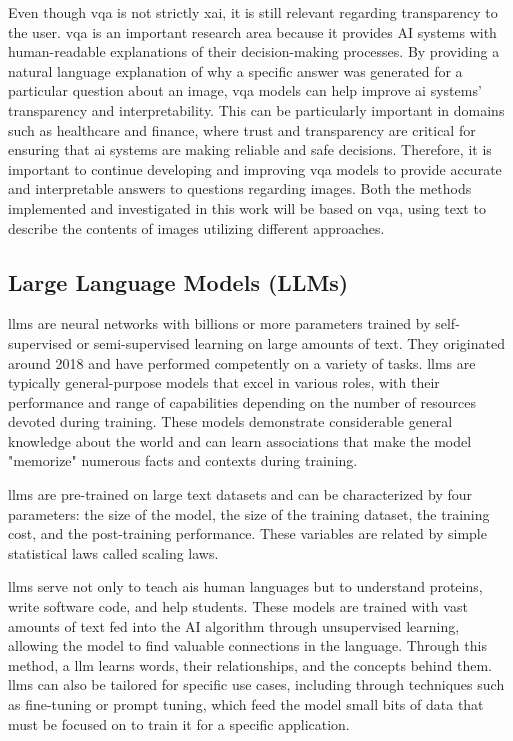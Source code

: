 Even though \gls{vqa} is not strictly \gls{xai}, it is still relevant regarding transparency to the user. \gls{vqa} is an important research area because it provides AI systems with human-readable explanations of their decision-making processes.
By providing a natural language explanation of why a specific answer was generated for a particular question about an image, \gls{vqa} models can help improve \gls{ai} systems' transparency and interpretability. This can be particularly important in domains such as healthcare and finance, where trust and transparency are critical for ensuring that \gls{ai} systems are making reliable and safe decisions. Therefore, it is important to continue developing and improving \gls{vqa} models to provide accurate and interpretable answers to questions regarding images.
Both the methods implemented and investigated in this work will be based on \gls{vqa}, using text to describe the contents of images utilizing different approaches.

\subsection{Large Language Models (LLMs)}

    \glspl{llm} are neural networks with billions or more parameters trained by self-supervised or semi-supervised learning on large amounts of text. They originated around 2018 and have performed competently on a variety of tasks. \glspl{llm} are typically general-purpose models that excel in various roles, with their performance and range of capabilities depending on the number of resources devoted during training. These models demonstrate considerable general knowledge about the world and can learn associations that make the model "memorize" numerous facts and contexts during training. 

    
    
    \glspl{llm} are pre-trained on large text datasets and can be characterized by four parameters: the size of the model, the size of the training dataset, the training cost, and the post-training performance. These variables are related by simple statistical laws called scaling laws. 

    \glspl{llm} serve not only to teach \glspl{ai} human languages but to understand proteins, write software code, and help students. These models are trained with vast amounts of text fed into the AI algorithm through unsupervised learning, allowing the model to find valuable connections in the language. Through this method, a \gls{llm} learns words, their relationships, and the concepts behind them. \glspl{llm} can also be tailored for specific use cases, including through techniques such as fine-tuning or prompt tuning, which feed the model small bits of data that must be focused on to train it for a specific application.
    
